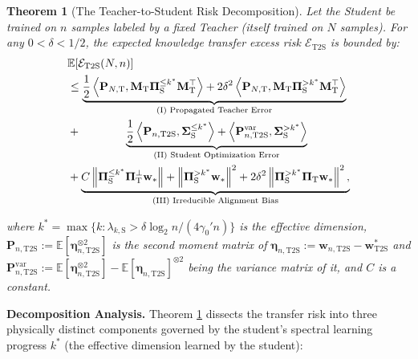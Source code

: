 \documentclass{article}
\theoremstyle{definition}
\theoremstyle{definition}
\theoremstyle{plain}
\newtheorem{theorem}{Theorem}
\theoremstyle{plain}
\theoremstyle{plain}
\theoremstyle{plain}
\theoremstyle{plain}
\newcommand{\bs}[1]{\boldsymbol{\mathbf{#1}}}
\newcommand{\Ex}{\mathbb{E}}
\newcommand{\te}{\mathrm{T}}
\newcommand{\st}{\mathrm{S}}
\newcommand{\ts}{\mathrm{T2S}}
\newcommand{\M}{\mathbf{M}}
\newcommand{\Sig}{\mathbf{\Sigma}}
\newcommand{\w}{\mathbf{w}}
\newcommand{\nm}[2][]{\left\| #2 \right\|^2_{#1}}
\newcommand{\inner}[1]{\left\langle#1\right\rangle}
\begin{document}
\begin{theorem}[The Teacher-to-Student Risk Decomposition]
\label{thm:generalt2s}
    Let the Student be trained on $n$ samples labeled by a fixed Teacher (itself trained on $N$ samples). For any $0<\delta<1/2$, the expected knowledge transfer excess risk $\mathcal{E}_{\mathrm{T2S}}$ is bounded by:
    \begingroup
    \allowdisplaybreaks
    \small 
    \begin{align} 
        \label{eq:t2s_decomposition}
        &\Ex[\mathcal{E}_{\mathrm{T2S}}(N,n)] \\ 
        &\leq \underbrace{\frac{1}{2}\inner{\bs P_{N,\te},\M_\te\bs \Pi_{\st}^{\leq k^*}\M_\te^\top}+2\delta^2\inner{\bs P_{N,\te},\M_\te\bs \Pi_{\st}^{> k^*}\M_\te^\top}}_{\text{(I) Propagated Teacher Error}} \notag \\ 
        &+ \quad\quad\quad\quad\underbrace{\frac{1}{2}\inner{\bs P_{n,\ts},\Sig_{\st}^{\leq k^*}}+ \inner{\bs P^{\mathrm{var}}_{n,\ts},\Sig_\st^{> k^*}}}_{\text{(II) Student Optimization Error}} \notag \\
        &+ \underbrace{C\left\|\bs \Pi_{\st}^{\leq k^*}\bs \Pi_{\te}^{\perp}\w_{*}\right\|+\nm{\bs \Pi_{\st}^{> k^*}\w_{*}}+2\delta^2\nm{\bs \Pi_{\st}^{> k^*}\bs \Pi_{\te}\w_*},}_{\text{(III) Irreducible Alignment Bias}} \notag
    \end{align}
    \endgroup
    \vspace{-0.5cm}
    
    \noindent where $k^* = \max\{k:\lambda_{k,\st}> \delta\log_2 n/ (4\gamma_0' n) \}$ is the effective dimension, $\bs P_{n,\ts}:=\Ex[\bs\eta_{n,\ts}^{\otimes2}]$ is the second moment matrix of $\bs\eta_{n,\ts}:=\w_{n,\ts}-\w^*_{\ts}$ and $\bs P^{\mathrm{var}}_{n,\ts}:=\Ex[\bs\eta_{n,\ts}^{\otimes2}]-\Ex[\bs\eta_{n,\ts}]^{\otimes2}$ being the variance matrix of it, and $C$ is a constant.
\end{theorem}

\textbf{Decomposition Analysis.} Theorem \ref{thm:generalt2s} dissects the transfer risk into three physically distinct components governed by the student's spectral learning progress $k^*$ (the effective dimension learned by the student):

\end{document}
